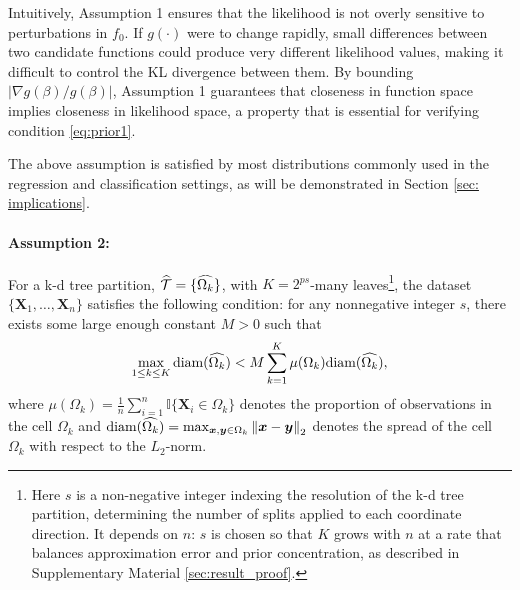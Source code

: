 \documentclass[12pt]{article}
\newcommand{\bm}[1]{\boldsymbol{#1}}
\newcommand{\norm}[1]{\left\Vert#1\right\Vert}
\newcommand{\1}{\mathbb{I}}
\newcommand{\wh}[1]{\smash{\widehat{#1}}}
\def\X{\bm{X}}
\def\x{\bm{x}}
\def\y{\bm{y}}
\def\x{\mbox{\boldmath$x$}}
\def\y{\mbox{\boldmath$y$}}
\def\X{\mbox{\boldmath$X$}}
\def\X{\bm{X}}
\def\x{\bm{x}}
\def\y{\bm{y}}
\theoremstyle{plain}
\theoremstyle{definition}
\theoremstyle{remark}
\begin{document}

Intuitively, Assumption 1 ensures that the likelihood is not overly sensitive to perturbations in $f_0$. If $g(\cdot)$ were to change rapidly, small differences between two candidate functions could produce very different likelihood values, making it difficult to control the KL divergence between them. By bounding $|\nabla g(\beta)/g(\beta)|$, Assumption 1 guarantees that closeness in function space implies closeness in likelihood space, a property that is essential for verifying condition \eqref{eq:prior1}.

The above assumption is satisfied by most distributions commonly used in the regression and classification settings, as will be demonstrated in Section \ref{sec: implications}.

\paragraph{Assumption 2:} For a k-d tree partition, $\wh{\mathcal{T}} = \{\wh{\Omega_k}\}$, with $K=2^{p s}$-many leaves\footnote{Here $s$ is a non-negative integer indexing the resolution of the k-d tree partition, determining the number of splits applied to each coordinate direction. It depends on $n$: $s$ is chosen so that $K$ grows with $n$ at a rate 
that balances approximation error and prior concentration, as described in 
Supplementary Material \ref{sec:result_proof}.},  the dataset $\{\X_1, \dots, \X_n\}$ satisfies the following condition: for any nonnegative integer $s$, there exists some large enough constant $M > 0$ such that
\begin{equation}\label{eq:regular_dataset}
\max_{1 \le k \le K} \text{diam}(\wh{\Omega_k}) < M \sum_{k=1}^K \mu(\Omega_k) \text{diam}(\wh{\Omega_k}),
\end{equation}
where $\mu(\Omega_k) = \frac{1}{n} \sum_{i=1}^n \mathbb{I}\{\X_i \in \Omega_k\}$ denotes the proportion of observations in the cell $\Omega_k$ and $\text{diam}(\wh{\Omega_k}) = \max_{\x,\y \in \Omega_k} \norm{\x - \y}_2$ denotes the spread of the cell $\Omega_k$ with respect to the $L_2$-norm.
\end{document}
